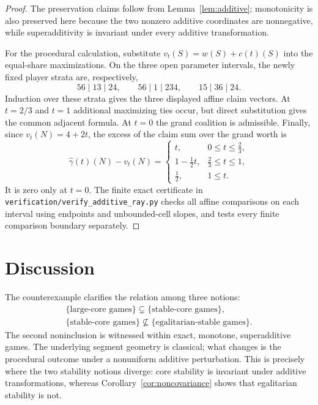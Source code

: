 \documentclass[11pt]{article}
\begin{document}
\begin{proof}
The preservation claims follow from Lemma~\ref{lem:additive}; monotonicity is
also preserved here because the two nonzero additive coordinates are
nonnegative, while superadditivity is invariant under every additive
transformation.

For the procedural calculation, substitute $v_t(S)=w(S)+c(t)(S)$ into the
equal-share maximizations.  On the three open parameter intervals, the newly
fixed player strata are, respectively,
\[
 56\mid13\mid24,\qquad
 56\mid1\mid234,\qquad
 15\mid36\mid24.
\]
Induction over these strata gives the three displayed affine claim vectors.
At $t=2/3$ and $t=1$ additional maximizing ties occur, but direct substitution
gives the common adjacent formula.  At $t=0$ the grand coalition is admissible.
Finally, since $v_t(N)=4+2t$, the excess of the claim sum over the grand worth is
\[
 \widehat\gamma(t)(N)-v_t(N)=
 \begin{cases}
 t,&0\leq t\leq\frac23,\\
 1-\frac12t,&\frac23\leq t\leq1,\\
 \frac12,&1\leq t.
 \end{cases}
\]
It is zero only at $t=0$. The finite exact certificate in
\texttt{verification/verify\_additive\_ray.py} checks all affine comparisons
on each interval using endpoints and unbounded-cell slopes, and tests every
finite comparison boundary separately.
\end{proof}


\section{Discussion}\label{sec:discussion}

The counterexample clarifies the relation among three notions:
\[
\begin{gathered}
 \{\text{large-core games}\}\subsetneq
 \{\text{stable-core games}\},\\
 \{\text{stable-core games}\}\not\subseteq
 \{\text{egalitarian-stable games}\}.
\end{gathered}
\]
The second noninclusion is witnessed within exact, monotone, superadditive
games. The underlying segment geometry is classical; what changes is the
procedural outcome under a nonuniform additive perturbation. This is precisely
where the two stability notions diverge: core stability is invariant under
additive transformations, whereas Corollary~\ref{cor:noncovariance} shows that
egalitarian stability is not.
\end{document}
